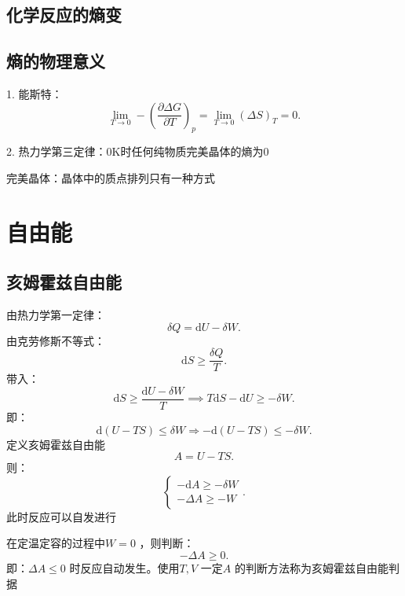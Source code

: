 \subsection{化学反应的熵变}%
\label{sub:化学反应的熵变}
\subsection{熵的物理意义}%
\label{sub:熵的物理意义}
1. 能斯特：\[
    \lim_{T \to 0} -\left(\frac{\partial \Delta G}{\partial T}\right)_{p} = \lim_{T \to 0} \left( \Delta S \right)_T = 0
.\]

2. 热力学第三定律：0K时任何纯物质完美晶体的熵为0
\begin{notation}
    完美晶体：晶体中的质点排列只有一种方式
\end{notation}
\section{自由能}%
\label{sec:自由能}
\subsection{亥姆霍兹自由能}%
\label{sub:亥姆霍兹自由能}
\begin{defi}
    由热力学第一定律：\[
        \delta Q = \mathrm{d}U -\delta W
    .\]
    由克劳修斯不等式：\[
        \mathrm{d}S \ge \frac{\delta Q}{T}
    .\]
    带入：\[
        \mathrm{d}S \ge \frac{\mathrm{d}U - \delta W}{T} \implies T\mathrm{d}S -\mathrm{d}U \ge -\delta W
    .\]
    即：\[
        \mathrm{d}\left( U-TS \right)\le \delta W \Rightarrow -\mathrm{d}\left( U-TS \right) \le -\delta W
    .\]
    定义亥姆霍兹自由能\[\boxed{
        A = U-TS
    .}\] 
    则：\[
        \begin{cases}
            -\mathrm{d}A \ge -\delta W\\
            -\Delta A \ge -W
        \end{cases}
    .\]
    此时反应可以自发进行
\end{defi}
在定温定容的过程中$W=0$ ，则判断：\[
    -\Delta A \ge 0
.\]
即：$\Delta A\le 0$ 时反应自动发生。使用$T,V$ 一定$A$ 的判断方法称为亥姆霍兹自由能判据
